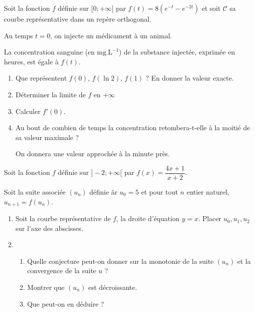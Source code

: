 \begin{question}[topic=exponentielle]
  Soit la fonction $f$ définie sur $[0;+\infty[$ par $f(t) = 8(e^{-t} -
  e^{-2t})$ et soit $\mathcal{C}$ sa courbe représentative dans un
  repère orthogonal.

  Au temps $t = 0$, on injecte un médicament à un animal.

  La concentration sanguine (en $\mathrm{mg.L^{-1}}$) de la substance
  injectée, exprimée en heures, est égale à $f(t)$.

  \begin{enumerate}
    \item Que représentent $f(0)$, $f(\ln 2)$, $f(1)$ ? En donner la valeur
      exacte.
    \item Déterminer la limite de $f$ en $+\infty$
    \item Calculer $f'(0)$.
    \item Au bout de combien de temps la concentration retombera-t-elle à la
      moitié de sa valeur maximale ?

      On donnera une valeur approchée à la minute près.
  \end{enumerate}
\end{question}

\begin{question}[topic=suites]
  Soit la fonction $f$ définie sur $]-2; +\infty[$ par $f(x) =
  \dfrac{4x+1}{x+2}$.

  Soit la suite associée $(u_n)$ définie âr $u_0 = 5$ et pour tout $n$
  entier naturel, $u_{n+1} = f(u_n)$.

  \begin{enumerate}
    \item Soit la courbe représentative de $f$, la droite d'équation $y =
      x$. Placer $u_0, u_1, u_2$ sur l'axe des abscisses.

      \begin{center}
      \end{center}
    \item
      \begin{enumerate}
        \item Quelle conjecture peut-on donner sur la monotonie de la suite
          $(u_n)$ et la convergence de la suite $u$ ?
        \item Montrer que $(u_n)$ est décroissante.
        \item Que peut-on en déduire ?
      \end{enumerate}
  \end{enumerate}
\end{question}

